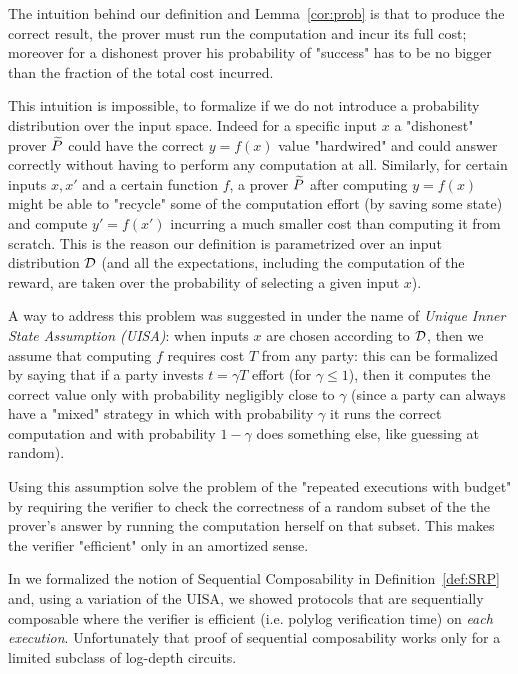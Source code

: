 
The intuition behind our definition and Lemma~\ref{cor:prob} is that to produce the correct result, the prover must run the computation and incur its full cost; moreover for a dishonest prover his probability of "success" has to be no bigger than the fraction of the total cost incurred. 

This intuition is impossible, to formalize if we do not introduce a probability distribution over the input space. Indeed for a specific input $x$ a "dishonest" prover $\widetilde{P}$ could have the correct 
$y=f(x)$ value "hardwired" and could answer correctly without having to perform any computation at all. Similarly, for certain inputs $x,x'$ and a certain 
function $f$, a prover $\widetilde{P}$ after computing $y=f(x)$ might be able to "recycle" some of the computation effort (by saving some state) and compute 
$y'=f(x')$ incurring a much smaller cost than computing it from scratch. This is the reason our definition is parametrized over an input distribution $\cal D$ (and all the expectations, including the computation of the reward, are taken over the probability of selecting a given input $x$). 

A way to address this problem was suggested in \cite{b08} under the name of {\em Unique Inner State Assumption (UISA)}: when inputs $x$ are chosen according to $\cal D$, then we assume that computing $f$ requires cost $T$ from any party: 
this can be formalized by saying that if a party invests $t=\gamma T$ effort (for $\gamma \leq 1$), then it computes the correct value only with
probability negligibly close to $\gamma$ (since 
a party can always have a "mixed" strategy in which with probability $\gamma$ it runs the correct computation and with probability $1-\gamma$ does 
something else, like guessing at random). 

Using this assumption \cite{b08} solve the problem of the "repeated executions with budget" by requiring the verifier to check the correctness of a random subset of the  the prover's answer by running the computation herself on that subset. This makes the verifier "efficient" only in an amortized sense. 

In \cite{cg15} we formalized the notion of Sequential Composability in 
Definition~\ref{def:SRP} and, using a variation of the UISA, we showed protocols that are sequentially composable where the verifier is efficient (i.e. polylog verification time) on {\em each execution}. Unfortunately that proof of sequential composability works only for a limited subclass of log-depth circuits. 

